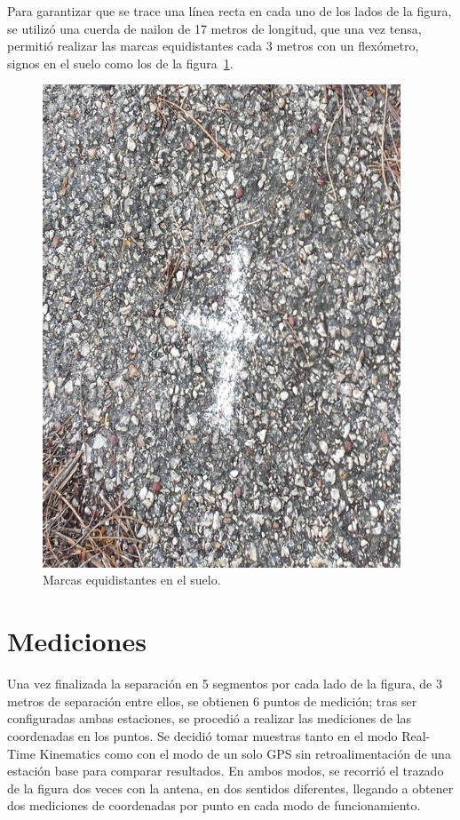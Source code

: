 Para garantizar que se trace una línea recta en cada uno de los lados de la figura, se utilizó una cuerda de nailon de 17 metros de longitud, que una vez tensa, permitió realizar las marcas equidistantes cada 3 metros con un flexómetro, signos en el suelo como los de la figura~\ref{fig:MarEq}.

\begin{figure}[H]
\centering
\includegraphics[width=0.95\textwidth]{Figures/Equid}
\caption[Marcas equidistantes en el suelo.]{Marcas equidistantes en el suelo.}
\label{fig:MarEq}
\end{figure}

\section{Mediciones}
Una vez finalizada la separación en 5 segmentos por cada lado de la figura, de 3 metros de separación entre ellos, se obtienen 6 puntos de medición; tras ser configuradas ambas estaciones, se procedió a realizar las mediciones de las coordenadas en los puntos. Se decidió tomar muestras tanto en el modo Real-Time Kinematics como con el modo de un solo GPS sin retroalimentación de una estación base para comparar resultados. En ambos modos, se recorrió el trazado de la figura dos veces con la antena, en dos sentidos diferentes, llegando a obtener dos mediciones de coordenadas por punto en cada modo de funcionamiento.\\

